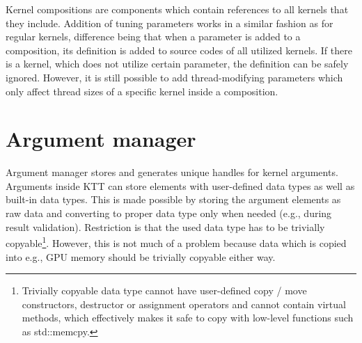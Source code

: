 \documentclass
[
    digital, %
    oneside, %
    table, %
    nolof, %
    nolot, %
    nocover %
]{fithesis3}
\begin{document}
Kernel compositions are components which contain references to all kernels that they include. Addition of tuning parameters works in a similar fashion
as for regular kernels, difference being that when a parameter is added to a composition, its definition is added to source codes of all utilized kernels.
If there is a kernel, which does not utilize certain parameter, the definition can be safely ignored. However, it is still possible to add thread-modifying
parameters which only affect thread sizes of a specific kernel inside a composition.

\section{Argument manager}
Argument manager stores and generates unique handles for kernel arguments. Arguments inside KTT can store elements with user-defined data types as well as
built-in data types. This is made possible by storing the argument elements as raw data and converting to proper data type only when needed (e.g., during
result validation). Restriction is that the used data type has to be trivially copyable\footnote{Trivially copyable data type cannot have user-defined
copy / move constructors, destructor or assignment operators and cannot contain virtual methods, which effectively makes it safe to copy with low-level
functions such as std::memcpy.}. However, this is not much of a problem because data which is copied into e.g., GPU memory should be trivially copyable
either way.
\end{document}
